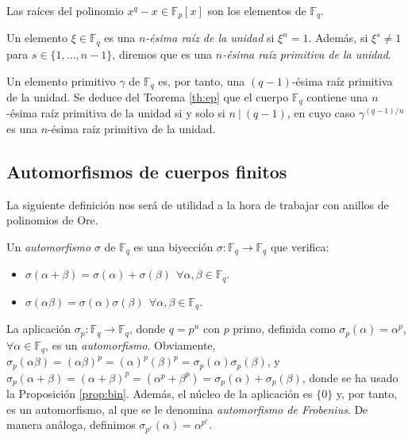 \begin{teorema}\label{th:raiz}
Las raíces del polinomio $x^q - x \in \mathbb{F}_p[x]$ son los elementos de $\mathbb{F}_q.$
\end{teorema}

\begin{definicion}
    
Un elemento $\xi \in \mathbb{F}_q$ es una \emph{$n$-ésima raíz de la unidad} si $\xi^n = 1$. Además, si $\xi^s \neq 1$ para $s \in \{1, \dots, n-1\}$, diremos que es una \emph{$n$-ésima raíz primitiva de la unidad}.
\end{definicion}

Un elemento primitivo $\gamma$ de $\mathbb{F}_q$ es, por tanto, una $(q-1)$-ésima raíz primitiva de la unidad. Se deduce del Teorema \ref{th:ep} que el cuerpo $\mathbb{F}_q$ contiene una $n$-ésima raíz primitiva de la unidad si y solo si $n \ | \ (q-1)$, en cuyo caso $\gamma^{(q-1)/n}$ es una $n$-ésima raíz primitiva de la unidad.


\subsection{Automorfismos de cuerpos finitos}

La siguiente definición nos será de utilidad a la hora de trabajar con anillos de  polinomios de Ore.

\begin{definicion}
Un \emph{automorfismo} $\sigma$ de $\mathbb{F}_q$ es una biyección $\sigma : \mathbb{F}_q \rightarrow \mathbb{F}_q$ que verifica:
\begin{itemize}
    \item $\sigma(\alpha + \beta) = \sigma(\alpha) + \sigma(\beta) \ \ \forall \alpha,\beta \in \mathbb{F}_q.$
    \item  $\sigma(\alpha\beta) = \sigma(\alpha)\sigma(\beta) \ \ \forall \alpha,\beta \in \mathbb{F}_q.$
\end{itemize}
\end{definicion}

La aplicación $\sigma_p: \mathbb{F}_q \rightarrow \mathbb{F}_q $, donde $q = p^n$ con $p$ primo, definida como $\sigma_p(\alpha) = \alpha^p$, $\forall \alpha \in \mathbb{F}_q$, es un \emph{automorfismo}. Obviamente, $\sigma_p(\alpha\beta) = (\alpha\beta)^p = (\alpha)^p(\beta)^p = \sigma_p(\alpha)\sigma_p(\beta)$, y $\sigma_p(\alpha + \beta) = (\alpha + \beta)^p = (\alpha^p + \beta^p) = \sigma_p(\alpha) + \sigma_p(\beta)$, donde se ha usado la Proposición \ref{prop:bin}. Además, el núcleo de la aplicación es $\{0\}$ y, por tanto, es un automorfismo, al que se le denomina \emph{automorfismo de Frobenius}. De manera análoga, definimos $\sigma_{p^r}(\alpha) =  \alpha^{p^r}$.

